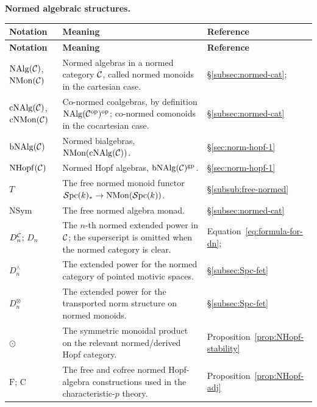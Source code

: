 \documentclass{amsart}
\numberwithin{proposition}{section}
\numberwithin{equation}{section}
\def\NSym{\mathrm{NSym}}
\def\NMon{\mathrm{NMon}}
\def\cNMon{\mathrm{cNMon}}
\def\NHopf{\mathrm{NHopf}}
\def\cNAlg{\mathrm{cNAlg}}
\def\bNAlg{\mathrm{bNAlg}}
\def\Free{\mathrm{F}}
\def\Cofree{\mathrm{C}}
\def\hotimes{\odot}
\begin{document}
\medskip
\noindent\textbf{Normed algebraic structures.}
\begin{longtable}{@{}>{\raggedright\arraybackslash}p{}>{\raggedright\arraybackslash}p{}>{\raggedright\arraybackslash}p{}@{}}
\textbf{Notation} & \textbf{Meaning} & \textbf{Reference} \\
\hline
\endfirsthead
\textbf{Notation} & \textbf{Meaning} & \textbf{Reference} \\
\hline
\endhead
$\mathrm{NAlg}(\mathcal C)$, $\NMon(\scr C)$ & Normed algebras in a normed category $\mathcal C$, called normed monoids in the cartesian case. & \S\ref{subsec:normed-cat}; \cite{bachmann-norms} \\
$\cNAlg(\scr C)$, $\cNMon(\scr C)$ & Co-normed coalgebras, by definition $\mathrm{NAlg}(\mathcal C^{\mathrm{op}})^{\mathrm{op}}$; co-normed comonoids in the cocartesian case. & \S\ref{subsec:normed-cat} \\
$\bNAlg(\scr C)$ & Normed bialgebras, $\NMon(\cNAlg(\scr C))$. & \S\ref{sec:norm-hopf-1} \\
$\NHopf(\scr C)$ & Normed Hopf algebras, $\bNAlg(\scr C)^{\gp}$. & \S\ref{sec:norm-hopf-1} \\
$T$ & The free normed monoid functor $\Spc(k)_*\to\NMon(\Spc(k))$. & \S\ref{subsub:free-normed} \\
$\NSym$ & The free normed algebra monad. & \S\ref{subsec:normed-cat} \\
$D_n^{\mathcal C}$; $D_n$ & The $n$-th normed extended power in $\mathcal C$; the superscript is omitted when the normed category is clear. & Equation~\eqref{eq:formula-for-dn}; \cite[Definition~5.6]{bachmann-colimits} \\
$D_n^\wedge$ & The extended power for the normed category of pointed motivic spaces. & \S\ref{subsec:Spc-fet} \\
$D_n^\otimes$ & The extended power for the transported norm structure on normed monoids. & \S\ref{subsec:Spc-fet} \\
$\hotimes$ & The symmetric monoidal product on the relevant normed/derived Hopf category. & Proposition~\ref{prop:NHopf-stability} \\
$\Free$; $\Cofree$ & The free and cofree normed Hopf-algebra constructions used in the characteristic-$p$ theory. & Proposition~\ref{prop:NHopf-adj} \\
\end{longtable}
\end{document}
